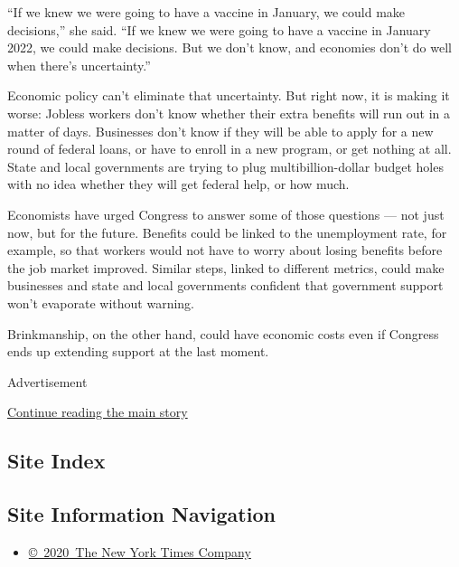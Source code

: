 ``If we knew we were going to have a vaccine in January, we could make
decisions,'' she said. ``If we knew we were going to have a vaccine in
January 2022, we could make decisions. But we don't know, and economies
don't do well when there's uncertainty.''

Economic policy can't eliminate that uncertainty. But right now, it is
making it worse: Jobless workers don't know whether their extra benefits
will run out in a matter of days. Businesses don't know if they will be
able to apply for a new round of federal loans, or have to enroll in a
new program, or get nothing at all. State and local governments are
trying to plug multibillion-dollar budget holes with no idea whether
they will get federal help, or how much.

Economists have urged Congress to answer some of those questions --- not
just now, but for the future. Benefits could be linked to the
unemployment rate, for example, so that workers would not have to worry
about losing benefits before the job market improved. Similar steps,
linked to different metrics, could make businesses and state and local
governments confident that government support won't evaporate without
warning.

Brinkmanship, on the other hand, could have economic costs even if
Congress ends up extending support at the last moment.

Advertisement

\protect\hyperlink{after-bottom}{Continue reading the main story}

\hypertarget{site-index}{%
\subsection{Site Index}\label{site-index}}

\hypertarget{site-information-navigation}{%
\subsection{Site Information
Navigation}\label{site-information-navigation}}

\begin{itemize}
\tightlist
\item
  \href{https://help.nytimes3xbfgragh.onion/hc/en-us/articles/115014792127-Copyright-notice}{©~2020~The
  New York Times Company}
\end{itemize}

